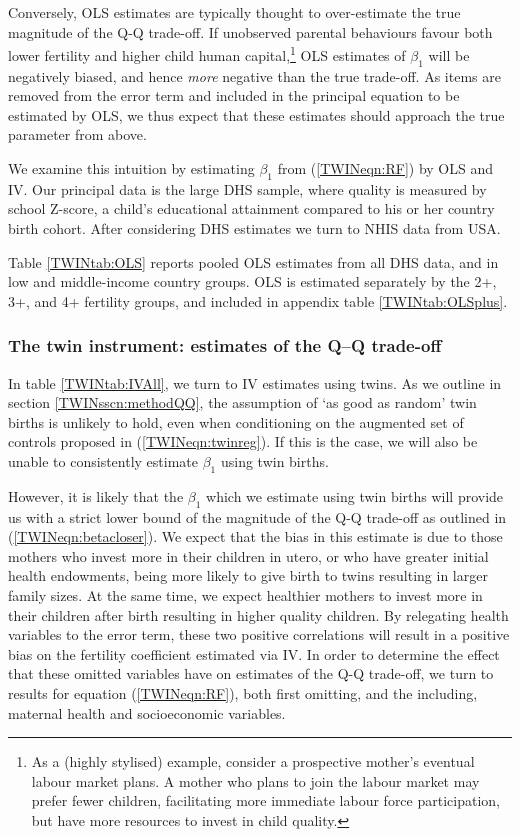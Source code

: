 \documentclass[subeqn]{article}
\begin{document}
\begin{spacing}{1.4}
Conversely, OLS estimates are typically thought to over-estimate the true 
magnitude of the Q-Q trade-off.  If unobserved parental behaviours favour both
lower fertility and higher child human capital,\footnote{As a (highly stylised) 
example, consider a prospective mother's eventual labour market plans. A mother 
who plans to join the labour market may prefer fewer children, facilitating more 
immediate labour force participation, but have more resources to invest in child
quality.} OLS estimates of $\beta_1$ will be negatively biased, and hence 
\emph{more} negative than the true trade-off.  As items are removed from the
error term and included in the principal equation to be estimated by OLS, we thus 
expect that these estimates should approach the true parameter from above.

We examine this intuition by estimating $\beta_1$ from (\ref{TWINeqn:RF}) by OLS 
and IV. Our principal data is the large DHS sample, where quality is measured by
school Z-score, a child's educational attainment compared to his or her country
birth cohort.  After considering DHS estimates we turn to NHIS data from USA.

Table \ref{TWINtab:OLS} reports pooled OLS estimates from all DHS data, and in 
low and middle-income country groups. OLS is estimated separately by the 2+, 3+,
and 4+ fertility groups, and included in appendix table \ref{TWINtab:OLSplus}.

\subsubsection{The twin instrument: estimates of the Q--Q trade-off}
In table \ref{TWINtab:IVAll}, we turn to IV estimates using twins.  As we outline 
in section \ref{TWINsscn:methodQQ}, the assumption of `as good as random' twin 
births is unlikely to hold, even when conditioning on the augmented set of 
controls proposed in (\ref{TWINeqn:twinreg}). If this is the case, we will also 
be unable to consistently estimate $\beta_1$ using twin births.

However, it is likely that the $\beta_1$ which we estimate using twin births 
will provide us with a strict lower bound of the magnitude of the Q-Q trade-off 
as outlined in (\ref{TWINeqn:betacloser}). We expect that the bias in this 
estimate is due to those mothers who invest more in their children in utero, or 
who have greater initial health endowments, being more likely to give birth to 
twins resulting in larger family sizes. At the same time, we expect healthier 
mothers to invest more in their children after birth resulting in higher 
quality children. By relegating health variables to the error term, these two 
positive correlations will result in a positive bias on the fertility 
coefficient estimated via IV. In order to determine the effect that these 
omitted variables have on estimates of the Q-Q trade-off, we turn to results for 
equation (\ref{TWINeqn:RF}), both first omitting, and the including, maternal 
health and socioeconomic variables.


\end{spacing}
\end{document}
